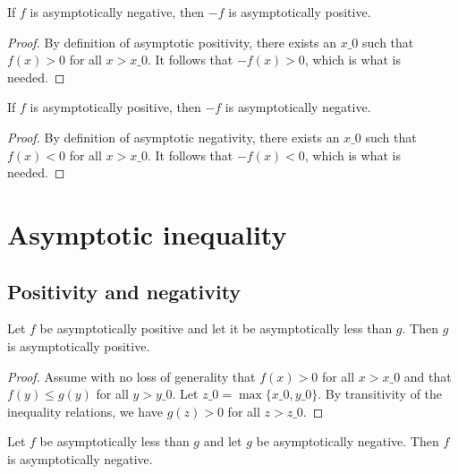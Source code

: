 \begin{lemma}
    \label{lemma:asymp_neg_of_pos}
    \leanok
    If $f$ is asymptotically negative, then $-f$ is asymptotically positive.
\end{lemma}

\begin{proof}
    \leanok
    By definition of asymptotic positivity, there exists an $x\_0$ such that $f(x) > 0$
    for all $x > x\_0$. It follows that $-f(x) > 0$, which is what is needed.
\end{proof}

\begin{lemma}
    \label{lemma:asymp_pos_of_neg}
    \leanok
    If $f$ is asymptotically positive, then $-f$ is asymptotically negative.
\end{lemma}

\begin{proof}
    \leanok
    By definition of asymptotic negativity, there exists an $x\_0$ such that $f(x) < 0$
    for all $x > x\_0$. It follows that $-f(x) < 0$, which is what is needed.
\end{proof}

\section{Asymptotic inequality}

\subsection{Positivity and negativity}

\begin{lemma}
    \label{lemma:asymp_pos_of_pos_le}
    \leanok
    Let $f$ be asymptotically positive and let it be asymptotically less than $g$.
    Then $g$ is asymptotically positive.
\end{lemma}

\begin{proof}
    \leanok
    Assume with no loss of generality that $f(x) > 0$ for all $x > x\_0$ and that
    $f(y) \le g(y)$ for all $y > y\_0$. Let $z\_0 = \max \{ x\_0, y\_0 \}$. By transitivity
    of the inequality relations, we have $g(z) > 0$ for all $z > z\_0$. 
\end{proof}

\begin{lemma}
    \label{lemma:asymp_neg_of_le_neg}
    \leanok
    Let $f$ be asymptotically less than $g$ and let $g$ be asymptotically negative.
    Then $f$ is asymptotically negative.
\end{lemma}

